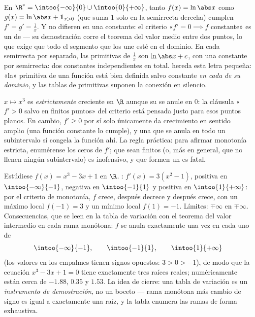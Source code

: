 \begin{example}\label{ex:b1:derivative:intervalmatters}
En $\R^* = \intoo{-\infty}{0} \cup \intoo{0}{+\infty}$, tanto
$f(x) = \ln\abs x$ como $g(x) = \ln\abs x + \mathbf{1}_{x>0}$ (que
suma $1$ solo en la semirrecta derecha) cumplen
$f' = g' = \frac1x$. Y no difieren en una constante: el criterio
«$f' = 0 \implies f$ constante» es un  de
\emph{} --- su demostración corre el teorema del valor medio
entre dos puntos, lo que exige que todo el segmento que los une esté
en el dominio. En cada semirrecta por separado, las primitivas de
$\frac1x$ son $\ln\abs x + c$, con una constante por semirrecta: dos
constantes independientes en total.  hereda
esta letra pequeña: «la» primitiva de una función está bien definida
salvo constante \emph{en cada  de su dominio}, y las tablas
de primitivas suponen la conexión en silencio.
\end{example}

\begin{example}\label{ex:b1:derivative:strictness}
$x \mapsto x^3$ es \emph{estrictamente} creciente en $\R$ aunque su
 se anule en $0$: la cláusula «$f' > 0$ salvo en finitos
puntos» del criterio está pensada justo para esos puntos planos. En
cambio, $f' \geq 0$ por sí solo únicamente da crecimiento en sentido
amplio (una función constante lo cumple), y una  que se anula
en todo un subintervalo sí congela la función ahí. La regla práctica:
para afirmar monotonía estricta, enumérense los ceros de $f'$; que
sean finitos (o, más en general, que no llenen ningún subintervalo) es
inofensivo, y que formen un  es fatal.
\end{example}

\begin{example}\label{ex:b1:derivative:variations}
Estúdiese $f(x) = x^3 - 3x + 1$ en $\R$. :
$f'(x) = 3(x^2 - 1)$, positiva en $\intoo{-\infty}{-1}$, negativa en
$\intoo{-1}{1}$ y positiva en $\intoo{1}{+\infty}$: por el criterio de
monotonía, $f$ crece, después decrece y después crece, con un máximo
local $f(-1) = 3$ y un mínimo local $f(1) = -1$. Límites: $\mp\infty$
en $\mp\infty$. Consecuencias, que se leen en la tabla de variación
con el teorema del valor intermedio en cada rama monótona: $f$ se
anula exactamente una vez en cada uno de
\[
\intoo{-\infty}{-1}, \qquad \intoo{-1}{1}, \qquad
\intoo{1}{+\infty}
\]
(los valores en los empalmes tienen signos opuestos: $3 > 0 > -1$), de
modo que la ecuación $x^3 - 3x + 1 = 0$ tiene exactamente tres raíces
reales; numéricamente están cerca de $-1.88$, $0.35$ y $1.53$. La
idea de cierre: una tabla de variación es un \emph{instrumento de
demostración}, no un boceto --- rama monótona más cambio de signo es
igual a exactamente una raíz, y la tabla enumera las ramas de forma
exhaustiva.
\end{example}

